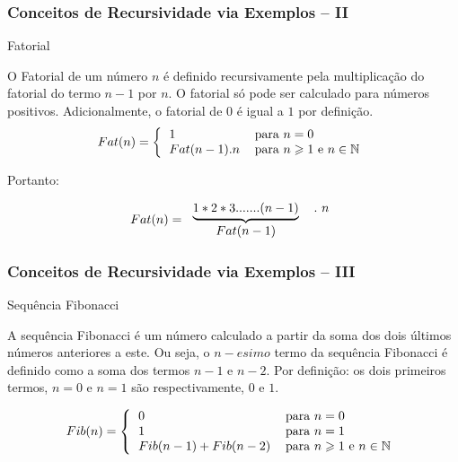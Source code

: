 \begin{frame}[fragile]
\frametitle{Conceitos de Recursividade via Exemplos -- II}


\begin{block}{Fatorial}

O Fatorial de um número $n$ é definido  recursivamente pela
 multiplicação do fatorial do termo $n-1$ por $n$. 
  O fatorial só pode ser calculado para números positivos. 
  Adicionalmente, o fatorial de $0$ é igual a 
  $1$ por definição.
    \[ 
    Fat(n)=\left\{
    \begin{tabular}[c]{ll}%
        $1$ & para $n = 0$\\
        $Fat(n-1) . n$ & para $n\geqslant1$ e $n \in \mathbb{N}$
    \end{tabular}
    \right.
    \]
    
    Portanto:
    
    \[
    Fat(n)=
    \begin{tabular}
        [c]{cc}%
        $\underbrace{1\ast2\ast3 . ..... . (n-1)}$ & $ .  \ n$\\
        $Fat(n-1)$ &
    \end{tabular}
    \]

\end{block}    
\end{frame}


\begin{frame}[fragile]
\frametitle{Conceitos de Recursividade via Exemplos -- III}

\begin{block}{Sequência Fibonacci}

A sequência Fibonacci é um número calculado a partir da soma dos
dois últimos números anteriores a este. Ou seja, o $n-esimo$ termo da 
sequência Fibonacci é 
definido como a soma dos termos $n-1$ e $n-2$. Por definição: os dois 
primeiros termos, $n = 0$ e $n=1$ são respectivamente, $0$ e $1$.
      
      \[
      Fib(n)=\left\{
      \begin{tabular}[c]{ll}%
          $0$ & para $n = 0$\\
          $1$ & para $n = 1$\\
          $Fib(n-1) + Fib(n-2)$ & para $n\geqslant1$ e $n \in \mathbb{N}$
      \end{tabular}
      \right.
      \]
 
\end{block}    
\end{frame}

